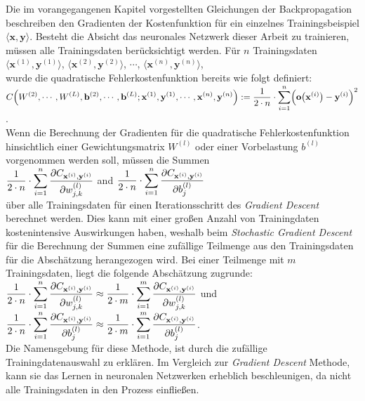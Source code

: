 \noindent
Die im vorangegangenen Kapitel vorgestellten Gleichungen der Backpropagation beschreiben den Gradienten der Kostenfunktion für ein einzelnes Trainingsbeispiel $\langle\mathbf{x}, \mathbf{y}\rangle$. Besteht die Absicht das neuronales Netzwerk dieser Arbeit zu trainieren, müssen alle Trainingsdaten berücksichtigt werden. Für $n$ Trainingsdaten 
\\[0.2cm]
\hspace*{1.3cm}
$\langle\mathbf{x}^{(1)}, \mathbf{y}^{(1)}\rangle$,
$\langle\mathbf{x}^{(2)}, \mathbf{y}^{(2)}\rangle$,
$\cdots$,
$\langle\mathbf{x}^{(n)}, \mathbf{y}^{(n)}\rangle$,
\\[0.2cm]
wurde die quadratische Fehlerkostenfunktion bereits wie folgt definiert: 
\\[0.2cm]
\hspace*{1.3cm}
$\displaystyle C\Bigr(W^{(2)}, \cdots, W^{(L)}, \mathbf{b}^{(2)}, \cdots, \mathbf{b}^{(L)};
     \mathbf{x}^{(1)}, \mathbf{y}^{(1)}, \cdots, \mathbf{x}^{(n)},\mathbf{y}^{(n)} \Bigr) := 
 \frac{1}{2 \cdot n} \cdot \sum\limits_{i=1}^n \Bigl(\mathbf{o}\bigl(\mathbf{x}^{(i)}\bigr) - \mathbf{y}^{(i)}\Bigr)^2
$.
\\[0.2cm]
Wenn die Berechnung der Gradienten für die quadratische Fehlerkostenfunktion hinsichtlich einer Gewichtungsmatrix $W^{(l)}$ oder einer Vorbelastung $b^{(l)}$ vorgenommen werden soll, müssen die Summen
\\[0.2cm]
\hspace*{1.3cm}
$\displaystyle \frac{1}{2\cdot n} \cdot \sum\limits_{i=1}^n \frac{\partial C_{\mathbf{x}^{(i)}, \mathbf{y}^{(i)}}}{\partial w_{j,k}^{(l)}}$
\quad and \quad
$\displaystyle \frac{1}{2\cdot n} \cdot \sum\limits_{i=1}^n \frac{\partial C_{\mathbf{x}^{(i)}, \mathbf{y}^{(i)}}}{\partial b_{j}^{(l)}}$
\\[0.2cm]
über alle Trainingsdaten für einen Iterationsschritt des \textit{Gradient Descent} berechnet werden. Dies kann mit einer großen Anzahl von Trainingdaten kostenintensive Auswirkungen haben, weshalb beim \textit{Stochastic Gradient Descent} für die Berechnung der Summen eine zufällige Teilmenge aus den Trainingsdaten für die Abschätzung herangezogen wird. Bei einer Teilmenge mit $m$ Trainingsdaten, liegt die folgende Abschätzung zugrunde:
\\[0.2cm]
$\displaystyle \frac{1}{2\cdot n} \cdot \sum\limits_{i=1}^n \frac{\partial C_{\mathbf{x}^{(i)}, \mathbf{y}^{(i)}}}{\partial w_{j,k}^{(l)}}
 \approx
 \frac{1}{2\cdot m} \cdot \sum\limits_{i=1}^m \frac{\partial C_{\mathbf{x}^{(i)}, \mathbf{y}^{(i)}}}{\partial w_{j,k}^{(l)}}
$
\quad und \quad
$\displaystyle \frac{1}{2\cdot n} \cdot \sum\limits_{i=1}^n \frac{\partial C_{\mathbf{x}^{(i)}, \mathbf{y}^{(i)}}}{\partial b_{j}^{(l)}}
     \approx
     \frac{1}{2\cdot m} \cdot \sum\limits_{i=1}^m \frac{\partial C_{\mathbf{x}^{(i)}, \mathbf{y}^{(i)}}}{\partial b_{j}^{(l)}}
$.
\\[0.2cm]
Die Namensgebung für diese Methode, ist durch die zufällige Trainingdatenauswahl zu erklären. Im Vergleich zur \textit{Gradient Descent} Methode, kann sie das Lernen in neuronalen Netzwerken erheblich beschleunigen, da nicht alle Trainingsdaten in den Prozess einfließen.